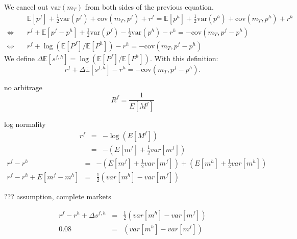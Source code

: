 We cancel out $\text{var}\left( m_T \right)$ from both sides of the previous equation.
\begin{align*}
  & \mathbb{E}\left[p^f\right]+\frac{1}{2}\text{var}\left(p^f\right) + \text{cov}\left(m_T, p^f\right) + r^f = \mathbb{E}\left[p^h\right]+\frac{1}{2}\text{var}\left(p^h\right)+\text{cov}\left(m_T,p^h\right) + r^h
  \\      \Leftrightarrow \quad
  & r^f+\mathbb{E}\left[p^f-p^h\right]+\frac{1}{2}\text{var}\left(p^f\right)-\frac{1}{2}\text{var}\left(p^h\right)-r^h = -\text{cov}\left(m_T,p^f-p^h\right)\\   
  \Leftrightarrow\quad
  &r^f+\log\left(\mathbb{E}\left[P^f\right]/\mathbb{E}\left[P^h\right]\right)-r^h = -\text{cov}\left(m_T,p^f-p^h\right)
\end{align*}
We define
$\Delta\mathbb{E}\left[s^{f,h}\right]
=\log\left(\mathbb{E}\left[P^f\right]/\mathbb{E}\left[P^h\right]\right).$
With this definition:
\begin{equation*} 
  r^f+\Delta\mathbb{E}\left[s^{f,h}\right]-r^h = -\text{cov}\left(m_T,p^f-p^h\right). 
\end{equation*}







no arbitrage%
\[
R^{f}=\frac{1}{E\left[ M^{f}\right] }
\]

log normality%
\begin{eqnarray*}
r^{f} &=&-\log \left( E\left[ M^{f}\right] \right)  \\
&=&-\left( E\left[ m^{f}\right] +\frac{1}{2}var\left[ m^{f}\right] \right) 
\end{eqnarray*}%
\begin{eqnarray*}
r^{f}-r^{h} &=&-\left( E\left[ m^{f}\right] +\frac{1}{2}var\left[ m^{f}%
\right] \right) +\left( E\left[ m^{h}\right] +\frac{1}{2}var\left[ m^{h}%
\right] \right)  \\
r^{f}-r^{h}+E\left[ m^{f}-m^{h}\right]  &=&\frac{1}{2}\left( var\left[ m^{h}%
\right] -var\left[ m^{f}\right] \right) 
\end{eqnarray*}

??? assumption, complete markets

\begin{eqnarray*}
r^{f}-r^{h}+\Delta s^{f,h} &=&\frac{1}{2}\left( var\left[ m^{h}\right] -var%
\left[ m^{f}\right] \right)  \\
0.08 &=&\left( var\left[ m^{h}\right] -var\left[ m^{f}\right] \right) 
\end{eqnarray*}%
\bigskip 